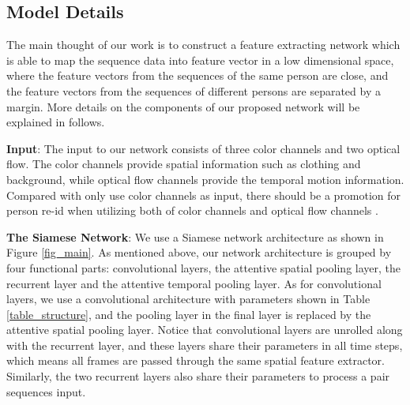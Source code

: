 \documentclass[10pt,twocolumn,letterpaper]{article}
\begin{document}
\subsection{Model Details}

The main thought of our work is to construct a feature extracting network which is able to map the sequence data into feature vector in a low dimensional space, where the feature vectors from the sequences of the same person are close, and the feature vectors from the sequences of different persons are separated by a margin. More details on the components of our proposed network will be explained in follows.

\textbf{Input}: The input to our network consists of three color channels and two optical flow. The color channels provide spatial information such as clothing and background, while optical flow channels provide the temporal motion information. Compared with only use color channels as input, there should be a promotion for person re-id when utilizing both of color channels and optical flow channels .

\textbf{The Siamese Network}: We use a Siamese network architecture as shown in Figure \ref{fig_main}. As mentioned above, our network architecture is grouped by four functional parts: convolutional layers, the attentive spatial pooling layer, the recurrent layer and the attentive temporal pooling layer. As for convolutional layers, we use a convolutional architecture with parameters shown in Table \ref{table_structure}, and the pooling layer in the final layer is replaced by the attentive spatial pooling layer. Notice that convolutional layers are unrolled along with the recurrent layer, and these layers share their parameters in all time steps, which means all frames are passed through the same spatial feature extractor. Similarly, the two recurrent layers also share their parameters to process a pair sequences input. 
\end{document}
